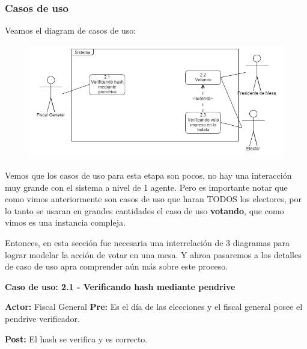 \subsubsection{Casos de uso}

Veamos el diagram de casos de uso:

\begin{figure}[h!]
\centering
\includegraphics[scale=0.45]{imagenes/CU/casosdeusosufragio}
\end{figure}


Vemos que los casos de uso para esta etapa son pocos, no hay una interacción muy grande con el sistema a nivel de 1 agente. Pero es importante notar que como vimos anteriormente son casos de uso que haran TODOS los electores, por lo tanto se usaran en grandes cantidades el caso de uso \textbf{votando}, que como vimos es una instancia compleja.

Entonces, en esta sección fue necesaria una interrelación de 3 diagramas para lograr modelar la acción de votar en una mesa. Y ahroa pasaremos a los detalles de caso de uso apra comprender aún más sobre este proceso.



\textbf{Caso de uso: 2.1 - Verificando hash mediante pendrive}

\textbf{Actor:} Fiscal General
\textbf{Pre:} Es el día de las elecciones y el fiscal general posee el pendrive verificador.

\textbf{Post:} El hash se verifica y es correcto.

